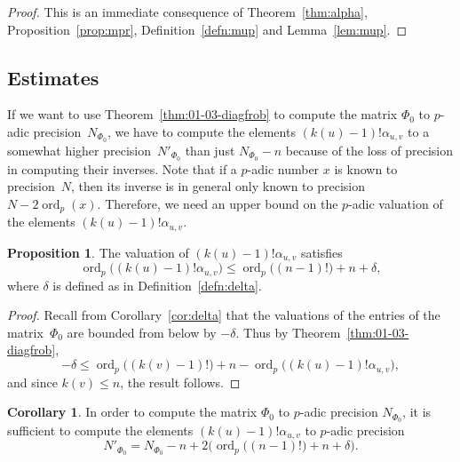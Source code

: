 \documentclass[a4paper,11pt]{article}
\numberwithin{equation}{section}
\DeclareMathOperator{\ord}{ord}          %
\theoremstyle{definition}
\newtheorem{prop}[thm]{Proposition}
\newtheorem{cor}[thm]{Corollary}
\begin{document}
\begin{proof}
This is an immediate consequence of Theorem~\ref{thm:alpha}, 
Proposition~\ref{prop:mpr}, Definition~\ref{defn:mup} and 
Lemma~\ref{lem:mup}.
\end{proof}

\subsection{Estimates}

If we want to use Theorem~\ref{thm:01-03-diagfrob} to compute the matrix 
$\Phi_0$ to $p$-adic precision~$N_{\Phi_0}$, we have to compute the elements
$(k(u)-1)!\alpha_{u,v}$ to a somewhat higher precision~$N'_{\Phi_0}$ than just
$N_{\Phi_0}-n$ because of the loss of precision in computing their inverses. Note 
that if a $p$-adic number $x$ is known to precision~$N$, then its inverse 
is in general only known to precision $N-2\ord_p(x)$. Therefore, we need an 
upper bound on the $p$-adic valuation of the elements $(k(u)-1)!\alpha_{u,v}$.

\begin{prop}
The valuation of $(k(u)-1)! \alpha_{u,v}$ satisfies
\begin{equation*}
\ord_p\bigl((k(u)-1)! \alpha_{u,v}\bigr) 
    \leq \ord_p\bigl((n-1)!\bigr) + n + \delta,
\end{equation*}
where $\delta$ is defined as in Definition~\ref{defn:delta}. 
\end{prop}

\begin{proof}
Recall from Corollary~\ref{cor:delta} that the valuations 
of the entries of the matrix~$\Phi_0$ are bounded from below by $-\delta$. 
Thus by Theorem~\ref{thm:01-03-diagfrob}, 
\begin{equation*}
-\delta \leq \ord_p\bigl((k(v)-1)!\bigr) + n 
           - \ord_p\bigl((k(u)-1)! \alpha_{u,v}\bigr),
\end{equation*}
and since $k(v) \leq n$, the result follows.
\end{proof}

\begin{cor} \label{cor:Ntilde}
In order to compute the matrix $\Phi_0$ to $p$-adic precision $N_{\Phi_0}$, 
it is sufficient to compute the elements $(k(u)-1)!\alpha_{u,v}$ to $p$-adic 
precision
\begin{equation*}
N'_{\Phi_0} = N_{\Phi_0} - n + 2 \bigl(\ord_p\bigl((n-1)!\bigr)+n+\delta\bigr).
\end{equation*}
\end{cor}
\end{document}
